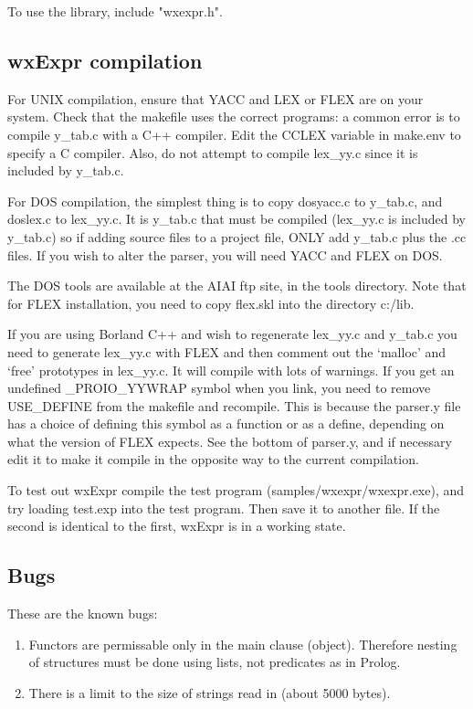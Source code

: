 To use the library, include "wxexpr.h".

\subsection{wxExpr compilation}

For UNIX compilation, ensure that YACC and LEX or FLEX are on your system. Check that
the makefile uses the correct programs: a common error is to compile
y\_tab.c with a C++ compiler. Edit the CCLEX variable in make.env
to specify a C compiler. Also, do not attempt to compile lex\_yy.c
since it is included by y\_tab.c.

For DOS compilation, the simplest thing is to copy dosyacc.c to y\_tab.c, and doslex.c to
lex\_yy.c. It is y\_tab.c that must be compiled (lex\_yy.c is included by
y\_tab.c) so if adding source files to a project file, ONLY add y\_tab.c
plus the .cc files. If you wish to alter the parser, you will need YACC
and FLEX on DOS.

The DOS tools are available at the AIAI ftp site, in the tools directory. Note that
for FLEX installation, you need to copy flex.skl into the directory
c:/lib.

If you are using Borland C++ and wish to regenerate lex\_yy.c and y\_tab.c
you need to generate lex\_yy.c with FLEX and then comment out the `malloc' and `free'
prototypes in lex\_yy.c. It will compile with lots of warnings. If you
get an undefined \_PROIO\_YYWRAP symbol when you link, you need to remove
USE\_DEFINE from the makefile and recompile. This is because the parser.y
file has a choice of defining this symbol as a function or as a define,
depending on what the version of FLEX expects. See the bottom of
parser.y, and if necessary edit it to make it compile in the opposite
way to the current compilation.

To test out wxExpr compile the test program (samples/wxexpr/wxexpr.exe),
and try loading test.exp into the test
program. Then save it to another file. If the second is identical to the
first, wxExpr is in a working state.

\subsection{Bugs}

These are the known bugs:

\begin{enumerate}\itemsep=0pt
\item Functors are permissable only in the main clause (object).
Therefore nesting of structures must be done using lists, not predicates
as in Prolog.
\item There is a limit to the size of strings read in (about 5000 bytes).
\end{enumerate}

